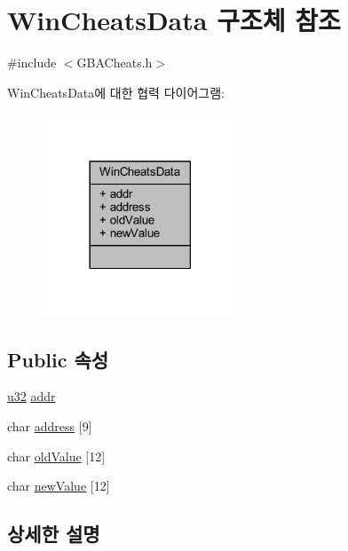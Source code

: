 \hypertarget{struct_win_cheats_data}{}\section{Win\+Cheats\+Data 구조체 참조}
\label{struct_win_cheats_data}


{\ttfamily \#include $<$G\+B\+A\+Cheats.\+h$>$}



Win\+Cheats\+Data에 대한 협력 다이어그램\+:\nopagebreak
\begin{figure}[H]
\begin{center}
\leavevmode
\includegraphics[width=165pt]{struct_win_cheats_data__coll__graph}
\end{center}
\end{figure}
\subsection*{Public 속성}
\begin{DoxyCompactItemize}
\item 
\mbox{\hyperlink{_system_8h_a10e94b422ef0c20dcdec20d31a1f5049}{u32}} \mbox{\hyperlink{struct_win_cheats_data_ace7d56c82bf83c2d88a5c1d6555b0b50}{addr}}
\item 
char \mbox{\hyperlink{struct_win_cheats_data_aee18406386236acfb28aa838a027b5b2}{address}} \mbox{[}9\mbox{]}
\item 
char \mbox{\hyperlink{struct_win_cheats_data_a62b624b83f4613d5753d49b4c9fcf0f1}{old\+Value}} \mbox{[}12\mbox{]}
\item 
char \mbox{\hyperlink{struct_win_cheats_data_ae00918c0a8daa1d847eaac10d63fd559}{new\+Value}} \mbox{[}12\mbox{]}
\end{DoxyCompactItemize}


\subsection{상세한 설명}


